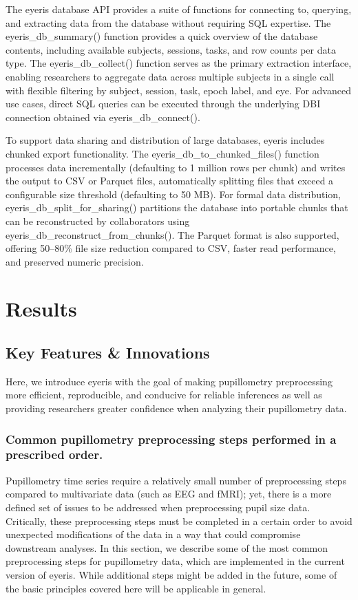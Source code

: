 The eyeris database API provides a suite of functions for connecting to, querying, and extracting data from the database without requiring SQL expertise. The eyeris\_db\_summary() function provides a quick overview of the database contents, including available subjects, sessions, tasks, and row counts per data type. The eyeris\_db\_collect() function serves as the primary extraction interface, enabling researchers to aggregate data across multiple subjects in a single call with flexible filtering by subject, session, task, epoch label, and eye. For advanced use cases, direct SQL queries can be executed through the underlying DBI connection obtained via eyeris\_db\_connect().

To support data sharing and distribution of large databases, eyeris includes chunked export functionality. The eyeris\_db\_to\_chunked\_files() function processes data incrementally (defaulting to 1 million rows per chunk) and writes the output to CSV or Parquet files, automatically splitting files that exceed a configurable size threshold (defaulting to 50 MB). For formal data distribution, eyeris\_db\_split\_for\_sharing() partitions the database into portable chunks that can be reconstructed by collaborators using eyeris\_db\_reconstruct\_from\_chunks(). The Parquet format is also supported, offering 50–80\% file size reduction compared to CSV, faster read performance, and preserved numeric precision.

\section{Results}
\subsection{Key Features \& Innovations}
Here, we introduce eyeris with the goal of making pupillometry preprocessing more efficient, reproducible, and conducive for reliable inferences as well as providing researchers greater confidence when analyzing their pupillometry data.

\subsubsection{Common pupillometry preprocessing steps performed in a prescribed order.}
Pupillometry time series require a relatively small number of preprocessing steps compared to multivariate data (such as EEG and fMRI); yet, there is a more defined set of issues to be addressed when preprocessing pupil size data. Critically, these preprocessing steps must be completed in a certain order to avoid unexpected modifications of the data in a way that could compromise downstream analyses. In this section, we describe some of the most common preprocessing steps for pupillometry data, which are implemented in the current version of eyeris. While additional steps might be added in the future, some of the basic principles covered here will be applicable in general.

